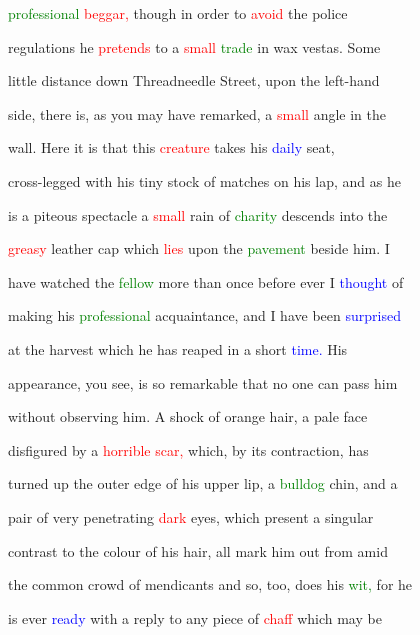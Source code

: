  \textcolor{green}{professional} \textcolor{red}{beggar,} though in order to \textcolor{red}{avoid} the \textcolor{BurntOrange}{police}

 regulations he \textcolor{red}{pretends} to a \textcolor{red}{small} \textcolor{green}{trade} in wax vestas. Some

 little distance down Threadneedle Street, upon the left-hand

 side, there is, as you may have remarked, a \textcolor{red}{small} angle in the

 wall. Here it is that this \textcolor{red}{creature} takes his \textcolor{blue}{daily} seat,

 cross-legged with his tiny stock of matches on his lap, and as he

 is a piteous \textcolor{BurntOrange}{spectacle} a \textcolor{red}{small} rain of \textcolor{green}{charity} descends into the

 \textcolor{red}{greasy} leather \textcolor{BurntOrange}{cap} which \textcolor{red}{lies} upon the \textcolor{green}{pavement} beside him. I

 have \textcolor{BurntOrange}{watched} the \textcolor{green}{fellow} more than once before ever I \textcolor{blue}{thought} of

 making his \textcolor{green}{professional} acquaintance, and I have been \textcolor{blue}{surprised}

 at the \textcolor{BurntOrange}{harvest} which he has reaped in a short \textcolor{blue}{time.} His

 appearance, you see, is so \textcolor{BurntOrange}{remarkable} that no one can pass him

 without observing him. A \textcolor{BurntOrange}{shock} of orange hair, a pale face

 disfigured by a \textcolor{red}{horrible} \textcolor{red}{scar,} which, by its contraction, has

 turned up the outer edge of his upper lip, a \textcolor{green}{bulldog} chin, and a

 pair of very penetrating \textcolor{red}{dark} eyes, which \textcolor{BurntOrange}{present} a singular

 contrast to the colour of his hair, all mark him out from amid

 the common crowd of mendicants and so, too, does his \textcolor{green}{wit,} for he

 is ever \textcolor{blue}{ready} with a reply to any piece of \textcolor{red}{chaff} which may be

